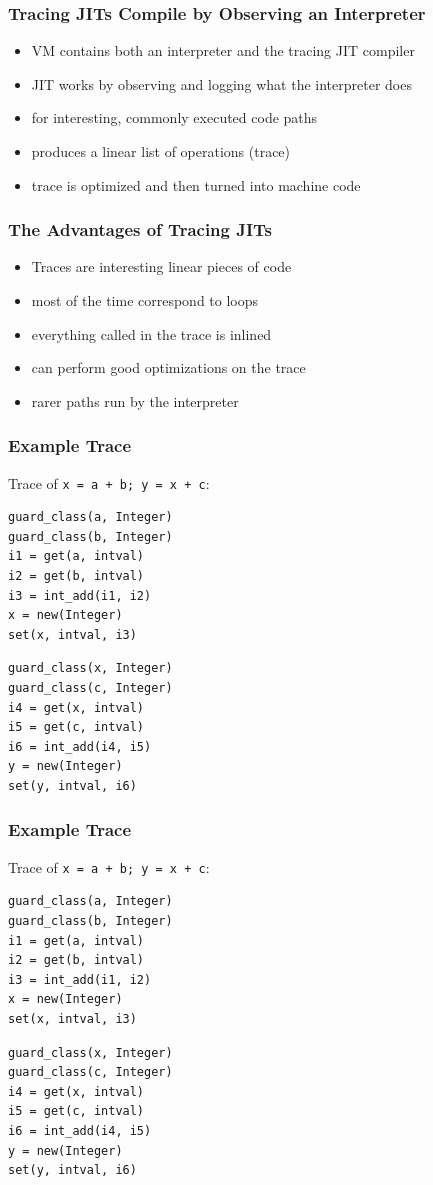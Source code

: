 \documentclass[utf8x]{beamer}
\begin{document}
\begin{frame}
  \frametitle{Tracing JITs Compile by Observing an Interpreter}
  \begin{itemize}
      \item VM contains both an interpreter and the tracing JIT compiler
      \item JIT works by observing and logging what the interpreter does
      \item for interesting, commonly executed code paths
      \item produces a linear list of operations (trace)
      \item trace is optimized and then turned into machine code
  \end{itemize}
\end{frame}

\begin{frame}
  \frametitle{The Advantages of Tracing JITs}
  \begin{itemize}
      \item Traces are interesting linear pieces of code
      \item most of the time correspond to loops
      \item everything called in the trace is inlined
      \item can perform good optimizations on the trace
      \item rarer paths run by the interpreter
  \end{itemize}
\end{frame}

\begin{frame}[containsverbatim]
  \frametitle{Example Trace}
  Trace of \texttt{x = a + b; y = x + c}:
\begin{verbatim}
guard_class(a, Integer)
guard_class(b, Integer)
i1 = get(a, intval)
i2 = get(b, intval)
i3 = int_add(i1, i2)
x = new(Integer)
set(x, intval, i3)
\end{verbatim}
\pause
\begin{verbatim}
guard_class(x, Integer)
guard_class(c, Integer)
i4 = get(x, intval)
i5 = get(c, intval)
i6 = int_add(i4, i5)
y = new(Integer)
set(y, intval, i6)
\end{verbatim}
\end{frame}

\begin{frame}[containsverbatim]
  \frametitle{Example Trace}
  Trace of \texttt{x = a + b; y = x + c}:
\begin{verbatim}
guard_class(a, Integer)
guard_class(b, Integer)
i1 = get(a, intval)
i2 = get(b, intval)
i3 = int_add(i1, i2)
x = new(Integer)
set(x, intval, i3)
\end{verbatim}
\begin{verbatim}
guard_class(x, Integer)
guard_class(c, Integer)
i4 = get(x, intval)
i5 = get(c, intval)
i6 = int_add(i4, i5)
y = new(Integer)
set(y, intval, i6)
\end{verbatim}
\end{frame}
\end{document}
